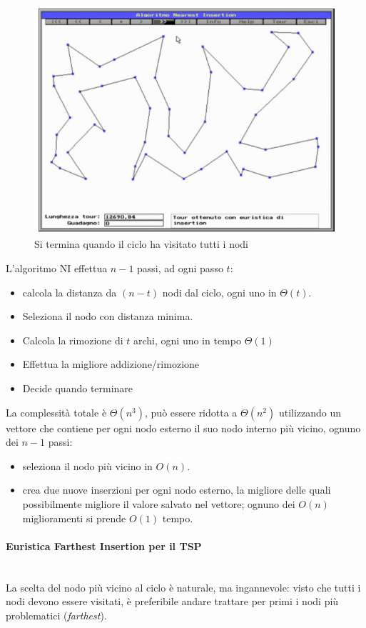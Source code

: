 \documentclass{article}
\begin{document}
\begin{figure}[H]
    \centering
    \includegraphics[scale=0.5]{images/NI3.png}
    \caption{Si termina quando il ciclo ha visitato tutti i nodi}
\end{figure}

L'algoritmo NI effettua $n-1$ passi, ad ogni passo $t$:
\begin{itemize}
    \item calcola la distanza da $(n-t)$ nodi dal ciclo, ogni uno in $\Theta(t)$.
    \item Seleziona il nodo con distanza minima.
    \item Calcola la rimozione di $t$ archi, ogni uno in tempo $\Theta (1)$
    \item Effettua la migliore addizione/rimozione
    \item Decide quando terminare
\end{itemize}
La complessità totale è $\Theta(n^3)$, può essere ridotta a $\Theta(n^2)$ utilizzando un vettore
che contiene per ogni nodo esterno il suo nodo interno più vicino, ognuno dei $n-1$ passi:
\begin{itemize}
    \item seleziona il nodo più vicino in $O(n)$.
    \item crea due nuove inserzioni per ogni nodo esterno, la migliore delle quali possibilmente migliore il valore
          salvato nel vettore; ognuno dei $O(n)$ miglioramenti si prende $O(1)$ tempo.
\end{itemize}

\paragraph{Euristica Farthest Insertion per il TSP}\mbox{}\\
La scelta del nodo più vicino al ciclo è naturale, ma ingannevole: visto che tutti i nodi devono essere visitati,
è preferibile andare trattare per primi i nodi più problematici (\textit{farthest}).
\end{document}
